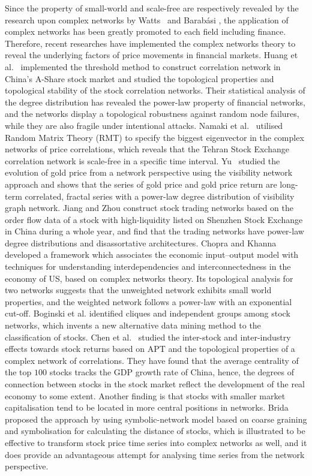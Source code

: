 Since the property of small-world and scale-free are respectively revealed by the research upon complex networks by Watts~\cite{watts1998collective} and Barab{\'a}si \cite{barabasi1999emergence}, the application of complex networks has been greatly promoted to each field including finance. Therefore, recent researches have implemented the complex networks theory to reveal the underlying factors of price movements in financial markets. Huang et al.~\cite{chinesenetwork} implemented the threshold method to construct correlation network in China's A-Share stock market and studied the topological properties and topological stability of the stock correlation networks. Their statistical analysis of the degree distribution has revealed the power-law property of financial networks, and the networks display a topological robustness against random node failures, while they are also fragile under intentional attacks. Namaki et al.~\cite{genuine} utilised Random Matrix Theory (RMT) to specify the biggest eigenvector in the complex networks of price correlations, which reveals that the Tehran Stock Exchange correlation network is scale-free in a specific time interval. Yu~\cite{visibility} studied the evolution of gold price from a network perspective using the visibility network approach and shows that the series of gold price and gold price return are long-term correlated, fractal series with a power-law degree distribution of visibility graph network. Jiang and Zhou \cite{jiang2010complex} construct stock trading networks based on the order flow data of a stock with high-liquidity listed on Shenzhen Stock Exchange in China during a whole year, and find that the trading networks have power-law degree distributions and disassortative architectures. Chopra and Khanna~\cite{intercd} developed a framework which associates the economic input–output model with techniques for understanding interdependencies and interconnectedness in the economy of US, based on complex networks theory. Its topological analysis for two networks suggests that the unweighted network exhibits small world properties, and the weighted network follows a power-law with an exponential cut-off. Boginski et al. \cite{statisticalanalysis} identified cliques and independent groups among stock networks, which  invents a new alternative data mining method to the classification of stocks. Chen et al.~\cite{CHEN2015224} studied the inter-stock and inter-industry effects towards stock returns based on APT and the topological properties of a complex network of correlations. They have found that the average centrality of the top $100$ stocks tracks the GDP growth rate of China, hence, the degrees of connection between stocks in the stock market reflect the development of the real economy to some extent. Another finding is that stocks with smaller market capitalisation tend to be located in more central positions in networks. Brida~\cite{brida2002high} proposed the approach by using symbolic-network model based on coarse graining and symbolisation for calculating the distance of stocks, which is illustrated to be effective to transform stock price time series into complex networks as well, and it does provide an advantageous attempt for analysing time series from the network perspective.



